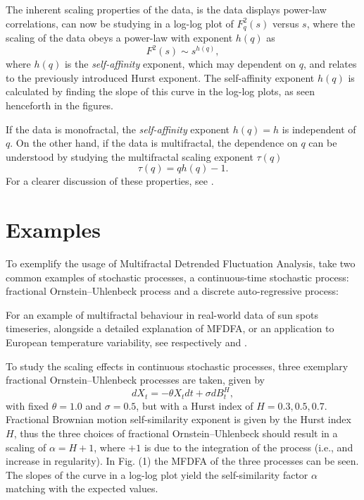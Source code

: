 \documentclass[pre, a4paper, aps, floatfix, superscriptaddress, onecolumn, notitlepage, longbibliography]{revtex4-1} %
\begin{document}
The inherent scaling properties of the data, is the data displays power-law correlations, can now be studying in a log-log plot of $F_q^2(s)$ versus $s$, where the scaling of the data obeys a power-law with exponent $h(q)$ as
\begin{equation}
  F^2(s) \sim s^{h(q)},\nonumber
\end{equation}
where $h(q)$ is the \textit{self-affinity} exponent, which may dependent on $q$, and relates to the previously introduced Hurst exponent.
The self-affinity exponent $h(q)$ is calculated by finding the slope of this curve in the log-log plots, as seen henceforth in the figures.

If the data is monofractal, the \textit{self-affinity} exponent $h(q)=h$ is independent of $q$.
On the other hand, if the data is multifractal, the dependence on $q$ can be understood by studying the multifractal scaling exponent $\tau(q)$ \cite{Barabasi1991}
\begin{equation}
  \tau(q) = qh(q) - 1.\nonumber
\end{equation}
For a clearer discussion of these properties, see \cite{Kantelhardt2002,Barabasi1991}.


\section{Examples}

To exemplify the usage of Multifractal Detrended Fluctuation Analysis, take two common examples of stochastic processes, a continuous-time stochastic process: fractional Ornstein--Uhlenbeck process and a discrete auto-regressive process:

For an example of multifractal behaviour in real-world data of sun spots timeseries, alongside a detailed explanation of MFDFA, or an application to European temperature variability, see respectively \cite{Movahed2006} and \cite{Meyer2019}.

To study the scaling effects in continuous stochastic processes, three exemplary fractional Ornstein--Uhlenbeck processes are taken, given by
\begin{equation}
  dX_t = - \theta X_t dt + \sigma d B^H_t, \tag{(1)}
\end{equation}
with fixed $\theta=1.0$ and $\sigma=0.5$, but with a Hurst index of $H=0.3, 0.5, 0.7$.
Fractional Brownian motion self-similarity exponent is given by the Hurst index $H$, thus the three choices of fractional Ornstein--Uhlenbeck should result in a scaling of $\alpha = H+1$, where $+1$ is due to the integration of the process (i.e., and increase in regularity).
In Fig. (1) the MFDFA of the three processes can be seen.
The slopes of the curve in a log-log plot yield the self-similarity factor $\alpha$ matching with the expected values.
\end{document}
